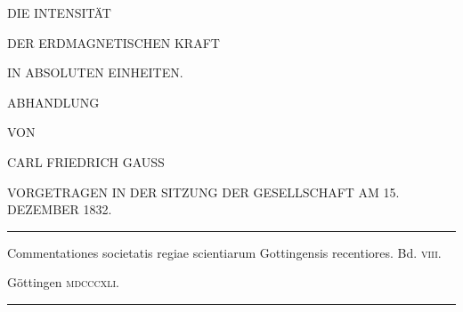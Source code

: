 \clearpage
\thispagestyle{empty}
\begin{center}
\vspace*{.6in}
{\large DIE INTENSITÄT\par}
\bigskip
{\Large DER ERDMAGNETISCHEN KRAFT\par}
\bigskip
{\large IN ABSOLUTEN EINHEITEN.\par}
\vspace{.4in}
ABHANDLUNG\par
\vspace{.4in}
{\small VON\par}
\bigskip
CARL FRIEDRICH GAUSS\par
\vspace{.4in}
{\small VORGETRAGEN IN DER SITZUNG DER GESELLSCHAFT AM 15. DEZEMBER 1832.\par}
\vfill
\rule{.8\textwidth}{.3pt}\par
\medskip
{\small Commentationes societatis regiae scientiarum Gottingensis recentiores. Bd. \textsc{viii}.\par}
Göttingen \textsc{mdcccxli}.\par
\medskip
\rule{.8\textwidth}{.3pt}\par
\end{center}
\clearpage
